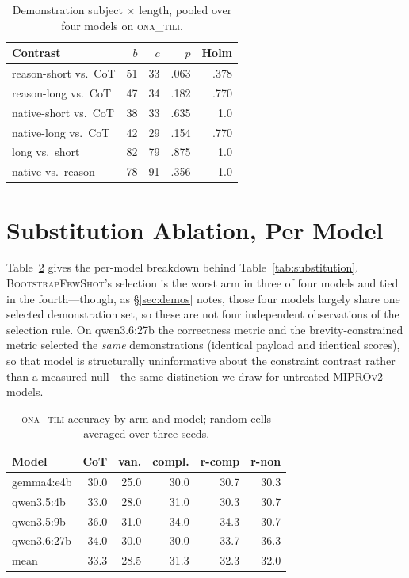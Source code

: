 \documentclass[11pt]{article}
\newcommand{\ona}{\textsc{ona\_tili}}
\newcommand{\bsfs}{\textsc{BootstrapFewShot}}
\begin{document}
\begin{table}[h]\centering\small
\caption{Demonstration subject $\times$ length, pooled over four models on \ona{}.}
\label{tab:demolab}
\setlength{\tabcolsep}{4pt}
\begin{tabular}{lrrrr}
\toprule
Contrast & $b$ & $c$ & $p$ & Holm \\
\midrule
reason-short vs.\ CoT & 51 & 33 & .063 & .378 \\
reason-long vs.\ CoT  & 47 & 34 & .182 & .770 \\
native-short vs.\ CoT & 38 & 33 & .635 & 1.0 \\
native-long vs.\ CoT  & 42 & 29 & .154 & .770 \\
long vs.\ short       & 82 & 79 & .875 & 1.0 \\
native vs.\ reason    & 78 & 91 & .356 & 1.0 \\
\bottomrule
\end{tabular}
\end{table}

\section{Substitution Ablation, Per Model}\label{app:substitution}

Table~\ref{tab:subpermodel} gives the per-model breakdown behind
Table~\ref{tab:substitution}. \bsfs{}'s selection is the worst arm in three of four
models and tied in the fourth---though, as \S\ref{sec:demos} notes, those four models
largely share one selected demonstration set, so these are not four independent
observations of the selection rule. On qwen3.6:27b the correctness metric and the
brevity-constrained metric selected the \emph{same} demonstrations (identical payload and
identical scores), so that model is structurally uninformative about the constraint
contrast rather than a measured null---the same distinction we draw for untreated
\textsc{MIPROv2} models.

\begin{table}[h]\centering\small
\caption{\ona{} accuracy by arm and model; random cells averaged over three seeds.}
\label{tab:subpermodel}
\setlength{\tabcolsep}{3pt}
\begin{tabular}{lrrrrr}
\toprule
Model & CoT & van. & compl. & r-comp & r-non \\
\midrule
gemma4:e4b  & 30.0 & 25.0 & 30.0 & 30.7 & 30.3 \\
qwen3.5:4b  & 33.0 & 28.0 & 31.0 & 30.3 & 30.7 \\
qwen3.5:9b  & 36.0 & 31.0 & 34.0 & 34.3 & 30.7 \\
qwen3.6:27b & 34.0 & 30.0 & 30.0 & 33.7 & 36.3 \\
\midrule
mean        & 33.3 & 28.5 & 31.3 & 32.3 & 32.0 \\
\bottomrule
\end{tabular}
\end{table}
\end{document}
